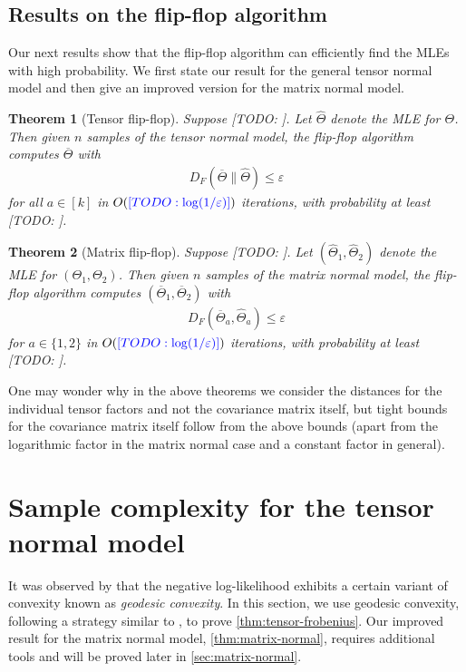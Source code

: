 \documentclass[aos]{imsart}
\newtheorem{theorem}{Theorem}[section]
\theoremstyle{definition}
\numberwithin{equation}{section}
\newcommand{\otheta}{\overline{\Theta}}
\newcommand{\htheta}{\widehat{\Theta}}
\newcommand{\eps}{\varepsilon}
\newcommand{\TODO}[1]{{\color{blue}[TODO: #1]}}
\begin{document}
\subsection{Results on the flip-flop algorithm}
Our next results show that the flip-flop algorithm can efficiently find the MLEs with high probability.
We first state our result for the general tensor normal model and then give an improved version for the matrix normal model.

\begin{theorem}[Tensor flip-flop]\label{thm:tensor-flipflop}
Suppose \TODO{}.
Let $\htheta$ denote the MLE for $\Theta$.
Then given $n$ samples of the tensor normal model, the flip-flop algorithm computes $\otheta$ with
\begin{align*}
  D_F(\otheta \rVert \htheta) \leq \eps
\end{align*}
for all $a\in[k]$ in $O(\TODO{\log(1/\eps)})$ iterations, with probability at least \TODO{}.
\end{theorem}

\begin{theorem}[Matrix flip-flop]\label{thm:matrix-flipflop}
Suppose \TODO{}.
Let $(\widehat{\Theta}_1,\widehat{\Theta}_2)$ denote the MLE for $(\Theta_1,\Theta_2)$.
Then given $n$ samples of the matrix normal model, the flip-flop algorithm computes $(\overline{\Theta}_1,\overline{\Theta}_2)$ with
\begin{align*}
  D_F(\overline{\Theta}_a, \widehat{\Theta}_a) \leq \eps
\end{align*}
for $a\in\{1,2\}$ in $O(\TODO{\log(1/\eps)})$ iterations, with probability at least \TODO{}.
\end{theorem}

One may wonder why in the above theorems we consider the distances for the individual tensor factors and not the covariance matrix itself, but tight bounds for the covariance matrix itself follow from the above bounds (apart from the logarithmic factor in the matrix normal case and a constant factor in general).


\section{Sample complexity for the tensor normal model}\label{sec:tensor-normal}
It was observed by \cite{wiesel2012geodesic} that the negative log-likelihood exhibits a certain variant of convexity known as \emph{geodesic convexity}.
In this section, we use geodesic convexity, following a strategy similar to \cite{FM20}, to prove \cref{thm:tensor-frobenius}.
Our improved result for the matrix normal model, \cref{thm:matrix-normal}, requires additional tools and will
be proved later in \cref{sec:matrix-normal}.
\end{document}
